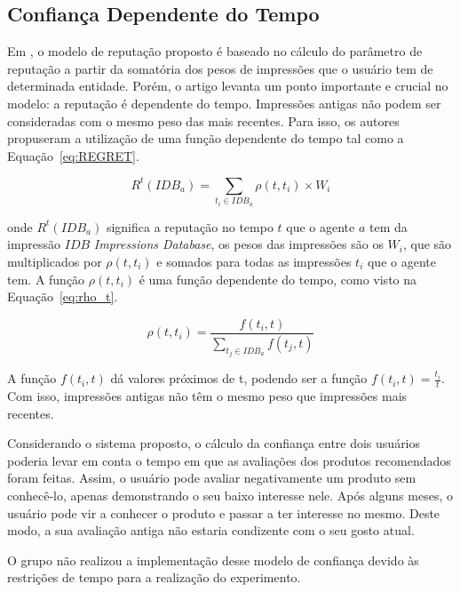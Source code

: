 
\subsection{Confiança Dependente do Tempo} %
\label{sub:confianca_dependente_do_tempo}

 Em \cite{sabater2001regret}, o modelo de reputação proposto é baseado no cálculo do parâmetro de reputação a partir da somatória dos pesos de impressões que o usuário tem de determinada entidade. Porém, o artigo levanta um ponto importante e crucial no modelo: a reputação é dependente do tempo. Impressões antigas não podem ser consideradas com o mesmo peso das mais recentes. Para isso, os autores propuseram a utilização de uma função dependente do tempo tal como a Equação~\ref{eq:REGRET}.
 
\begin{equation}
 R^t(IDB_a) = {\sum_{t_i\in{IDB_a}}}\rho(t,t_i)\times{W_i}
 \label{eq:REGRET} 
\end{equation}

 onde $R^t(IDB_a)$ significa a reputação no tempo $t$ que o agente $a$ tem da impressão $IDB$ \textit{Impressions Database}, os pesos das impressões são os $W_i$, que são multiplicados por $\rho(t,t_i)$ e somados para todas as impressões $t_i$ que o agente tem. A função $\rho(t,t_i)$ é uma função dependente do tempo, como visto na Equação~\ref{eq:rho_t}.
 
\begin{equation}
 \rho(t,t_i) = \frac{f(t_i,t)}{{\sum_{t_j\in{IDB_a}}}f(t_j,t)}
 \label{eq:rho_t} 
\end{equation}

 A função $f(t_i,t)$ dá valores próximos de t, podendo ser a função $f(t_i,t) = \frac{t_i}{t}$. Com isso, impressões antigas não têm o mesmo peso que impressões mais recentes.

 Considerando o sistema proposto, o cálculo da confiança entre dois usuários poderia levar em conta o tempo em que as avaliações dos produtos recomendados foram feitas. Assim, o usuário pode avaliar negativamente um produto sem conhecê-lo, apenas demonstrando o seu baixo interesse nele. Após alguns meses, o usuário pode vir a conhecer o produto e passar a ter interesse no mesmo. Deste modo, a sua avaliação antiga não estaria condizente com o seu gosto atual.
 
 O grupo não realizou a implementação desse modelo de confiança devido às restrições de tempo para a realização do experimento.

